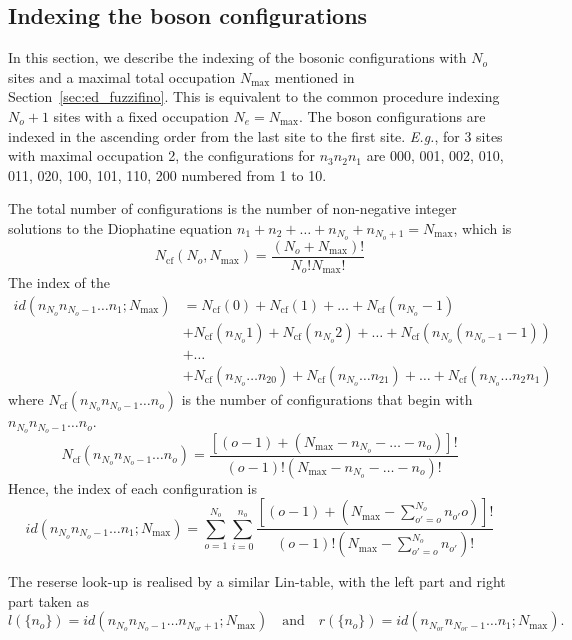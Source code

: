 \documentclass{timesjhep}
\begin{document}
\subsection{Indexing the boson configurations}
\label{app:data_boson}

In this section, we describe the indexing of the bosonic configurations with $N_o$ sites and a maximal total occupation $N_{\max}$ mentioned in Section~\ref{sec:ed_fuzzifino}. This is equivalent to the common procedure indexing $N_o+1$ sites with a fixed occupation $N_e=N_{\max}$. The boson configurations are indexed in the ascending order from the last site to the first site. \textit{E.g.}, for 3 sites with maximal occupation 2, the configurations for $n_3n_2n_1$ are 000, 001, 002, 010, 011, 020, 100, 101, 110, 200 numbered from 1 to 10. 

The total number of configurations is the number of non-negative integer solutions to the Diophatine equation $n_1+n_2+\dots+n_{N_o}+n_{N_o+1}=N_{\max}$, which is 
\begin{equation}
    N_\mathrm{cf}(N_o,N_{\max})=\frac{(N_o+N_{\max})!}{N_o!N_{\max}!}
\end{equation}
The index of the 
\begin{align}
    id(n_{N_o}n_{N_o-1}\dots n_1;N_{\max})&=N_\mathrm{cf}(0)+N_\mathrm{cf}(1)+\dots+N_\mathrm{cf}(n_{N_o}-1)\nonumber\\
    &+N_\mathrm{cf}(n_{N_o}1)+N_\mathrm{cf}(n_{N_o}2)+\dots+N_\mathrm{cf}(n_{N_o}(n_{N_o-1}-1))\nonumber\\
    &+\dots\nonumber\\
    &+N_\mathrm{cf}(n_{N_o}\dots n_20)+N_\mathrm{cf}(n_{N_o}\dots n_21)+\dots+N_\mathrm{cf}(n_{N_o}\dots n_2n_1)
\end{align}
where $N_\mathrm{cf}(n_{N_o}n_{N_o-1}\dots n_{o})$ is the number of configurations that begin with $n_{N_o}n_{N_o-1}\dots n_{o}$. 
\begin{equation}
    N_\mathrm{cf}(n_{N_o}n_{N_o-1}\dots n_{o})=\frac{[(o-1)+(N_{\max}-n_{N_o}-\dots-n_o)]!}{(o-1)!(N_{\max}-n_{N_o}-\dots-n_o)!}
\end{equation}
Hence, the index of each configuration is 
\begin{equation}
    id(n_{N_o}n_{N_o-1}\dots n_1;N_{\max})=\sum_{o=1}^{N_o}\sum_{i=0}^{n_o}\frac{\left[(o-1)+\left(N_{\max}-\sum_{o'=o}^{N_o}n_{o'}o\right)\right]!}{(o-1)!\left(N_{\max}-\sum_{o'=o}^{N_o}n_{o'}\right)!}
\end{equation}

The reserse look-up is realised by a similar Lin-table, with the left part and right part taken as
\begin{equation}
    l(\{n_o\})=id(n_{N_o}n_{N_o-1}\dots n_{N_{or}+1};N_{\max})\quad\textrm{and}\quad r(\{n_o\})=id(n_{N_{or}}n_{N_{or}-1}\dots n_{1};N_{\max}).
\end{equation} 
\end{document}
